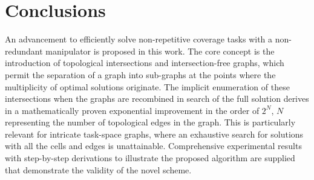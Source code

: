 \documentclass[journal]{IEEEtran}
\begin{document}
\section{Conclusions}
An advancement to efficiently solve non-repetitive coverage tasks with a non-redundant manipulator is proposed in this work. 
The core concept is the introduction of topological intersections and intersection-free graphs, which permit the separation of a graph 
into sub-graphs at the points where the multiplicity of optimal solutions originate. 
The implicit enumeration of these intersections when the graphs are recombined in search of the full solution derives in a mathematically proven exponential improvement in the order of $2^N$, $N$ representing the number of topological edges in the graph. This is particularly relevant for intricate task-space graphs,
where an exhaustive search for solutions with all the cells and edges is unattainable. 
Comprehensive experimental results with step-by-step derivations to illustrate the proposed algorithm are supplied that demonstrate the validity of the novel scheme. 
\label{section_conclusion}




\end{document}
